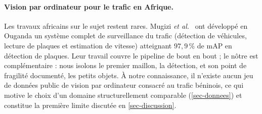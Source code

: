 \paragraph{Vision par ordinateur pour le trafic en Afrique.}
Les travaux africains sur le sujet restent rares.
Mugizi \emph{et al.}~\cite{mugizi2026traffic} ont développé en Ouganda
un système complet de surveillance du trafic (détection de véhicules,
lecture de plaques et estimation de vitesse) atteignant $97{,}9\,\%$ de
mAP en détection de plaques. Leur travail couvre le pipeline de bout en
bout ; le nôtre est complémentaire : nous isolons le premier maillon, la
détection, et son point de fragilité documenté, les petits objets. À
notre connaissance, il n'existe aucun jeu de données public de vision
par ordinateur consacré au trafic béninois, ce qui motive le choix d'un
domaine structurellement comparable (\cref{sec-donnees}) et constitue la
première limite discutée en \cref{sec-discussion}.
